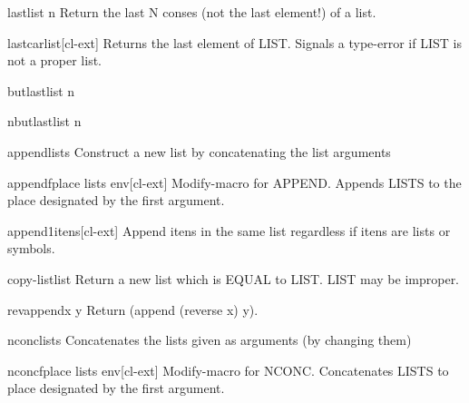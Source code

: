\documentclass[10pt,english]{book}
\begin{document}
\begin{function}{last}{list \op n}
  Return the last N conses (not the last element!) of a list.
\end{function}

\begin{function}{lastcar}{list}[cl-ext]
  Returns the last element of LIST. Signals a type-error if LIST is not a
proper list.
\end{function}

\begin{function}{butlast}{list \op n}
  
\end{function}

\begin{function}{nbutlast}{list \op n}
  
\end{function}

\begin{function}{append}{\rest lists}
  Construct a new list by concatenating the list arguments
\end{function}

\begin{macro}{appendf}{place \rest lists \env env}[cl-ext]
  Modify-macro for APPEND. Appends LISTS to the place designated by the first
argument.
\end{macro}

\begin{function}{append1}{\rest itens}[cl-ext]
  Append itens in the same list regardless if itens are lists or
  symbols.
\end{function}

\begin{function}{copy-list}{list}
  Return a new list which is EQUAL to LIST. LIST may be improper.
\end{function}

\begin{function}{revappend}{x y}
  Return (append (reverse x) y).
\end{function}

\begin{function}{nconc}{\rest lists}
  Concatenates the lists given as arguments (by changing them)
\end{function}

\begin{macro}{nconcf}{place \rest lists \env env}[cl-ext]
  Modify-macro for NCONC. Concatenates LISTS to place designated by the first
argument.
\end{macro}
\end{document}
